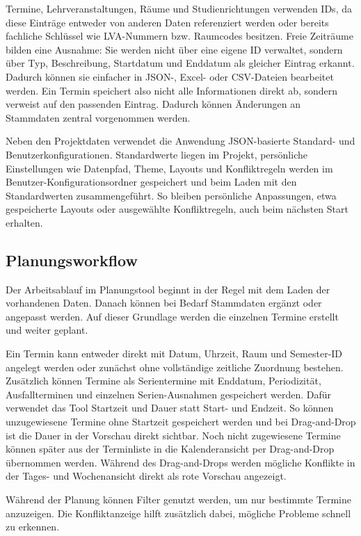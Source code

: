 \documentclass[12pt,a4paper]{article}
\begin{document}
Termine, Lehrveranstaltungen, Räume und Studienrichtungen verwenden IDs, da diese Einträge entweder von anderen Daten referenziert werden oder bereits fachliche Schlüssel wie LVA-Nummern bzw. Raumcodes besitzen. Freie Zeiträume bilden eine Ausnahme: Sie werden nicht über eine eigene ID verwaltet, sondern über Typ, Beschreibung, Startdatum und Enddatum als gleicher Eintrag erkannt. Dadurch können sie einfacher in JSON-, Excel- oder CSV-Dateien bearbeitet werden. Ein Termin speichert also nicht alle Informationen direkt ab, sondern verweist auf den passenden Eintrag. Dadurch können Änderungen an Stammdaten zentral vorgenommen werden.

Neben den Projektdaten verwendet die Anwendung JSON-basierte Standard- und Benutzerkonfigurationen.
Standardwerte liegen im Projekt, persönliche Einstellungen wie Datenpfad, Theme, Layouts und Konfliktregeln werden im Benutzer-Konfigurationsordner gespeichert und beim Laden mit den Standardwerten zusammengeführt.
So bleiben persönliche Anpassungen, etwa gespeicherte Layouts oder ausgewählte Konfliktregeln, auch beim nächsten Start erhalten.

\subsection{Planungsworkflow}

Der Arbeitsablauf im Planungstool beginnt in der Regel mit dem Laden der vorhandenen Daten. Danach können bei Bedarf Stammdaten ergänzt oder angepasst werden. Auf dieser Grundlage werden die einzelnen Termine erstellt und weiter geplant.

Ein Termin kann entweder direkt mit Datum, Uhrzeit, Raum und Semester-ID angelegt werden oder zunächst ohne vollständige zeitliche Zuordnung bestehen. Zusätzlich können Termine als Serientermine mit Enddatum, Periodizität, Ausfallterminen und einzelnen Serien-Ausnahmen gespeichert werden. Dafür verwendet das Tool Startzeit und Dauer statt Start- und Endzeit. 
So können unzugewiesene Termine ohne Startzeit gespeichert werden und bei Drag-and-Drop ist die Dauer in der Vorschau direkt sichtbar. Noch nicht zugewiesene Termine können später aus der Terminliste in die Kalenderansicht per Drag-and-Drop übernommen werden. 
Während des Drag-and-Drops werden mögliche Konflikte in der Tages- und Wochenansicht direkt als rote Vorschau angezeigt.

Während der Planung können Filter genutzt werden, um nur bestimmte Termine anzuzeigen. Die Konfliktanzeige hilft zusätzlich dabei, mögliche Probleme schnell zu erkennen.
\end{document}
